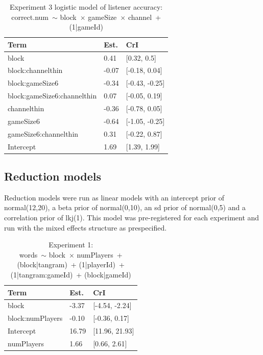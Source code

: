 \documentclass[
  english,
  a4paper,
]{article}
\begin{document}
\begin{table}[h!]

\caption{\label{tab:unnamed-chunk-10}Experiment 3 logistic model of listener accuracy:\\ correct.num~$\sim$ block~$\times$ gameSize~$\times$ channel~+ (1|gameId)}
\centering
\begin{tabular}[t]{lll}
\toprule
Term & Est. & CrI\\
\midrule
block & 0.41 & {}[0.32, 0.5]\\
block:channelthin & -0.07 & {}[-0.18, 0.04]\\
block:gameSize6 & -0.34 & {}[-0.43, -0.25]\\
block:gameSize6:channelthin & 0.07 & {}[-0.05, 0.19]\\
channelthin & -0.36 & {}[-0.78, 0.05]\\
\addlinespace
gameSize6 & -0.64 & {}[-1.05, -0.25]\\
gameSize6:channelthin & 0.31 & {}[-0.22, 0.87]\\
Intercept & 1.69 & {}[1.39, 1.99]\\
\bottomrule
\end{tabular}
\end{table}

\pagebreak

\hypertarget{reduction-models}{%
\subsection{Reduction models}\label{reduction-models}}

Reduction models were run as linear models with an intercept prior of normal(12,20), a beta prior of normal(0,10), an sd prior of normal(0,5) and a correlation prior of lkj(1). This model was pre-registered for each experiment and run with the mixed effects structure as prespecified.

\begin{table}[h!]

\caption{\label{tab:unnamed-chunk-11}Experiment 1:\\ words~$\sim$ block~$\times$ numPlayers~+ (block|tangram)~+ (1|playerId)~+ (1|tangram:gameId)~+ (block|gameId)}
\centering
\begin{tabular}[t]{lll}
\toprule
Term & Est. & CrI\\
\midrule
block & -3.37 & {}[-4.54, -2.24]\\
block:numPlayers & -0.10 & {}[-0.36, 0.17]\\
Intercept & 16.79 & {}[11.96, 21.93]\\
numPlayers & 1.66 & {}[0.66, 2.61]\\
\bottomrule
\end{tabular}
\end{table}
\end{document}
